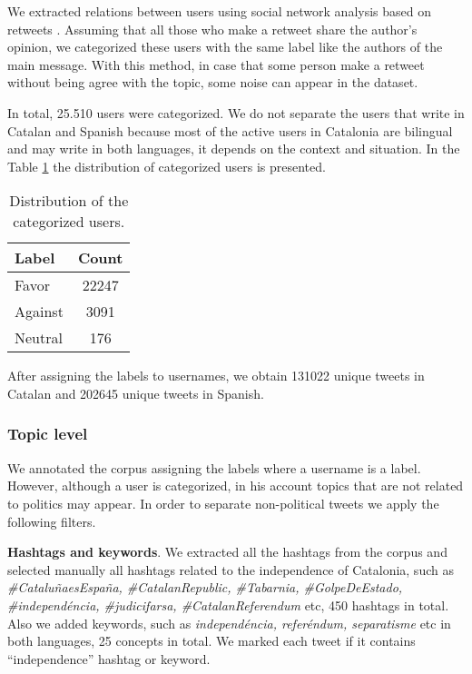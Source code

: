 \documentclass[10pt, a4paper]{article}
\begin{document}
We extracted relations between users using social network analysis based on retweets \cite{SNA2002}. Assuming that all those who make a retweet share the author's opinion, we categorized these users with the same label like the authors of the main message. With this method, in case that some person make a retweet without being agree with the topic, some noise can appear in the dataset.

In total, 25.510 users were categorized. We do not separate the users that write in Catalan and Spanish because most of the  active users in Catalonia are bilingual and may write in both languages, it depends on the context and situation. In the Table \ref{table:users} the distribution of categorized users is presented.

\begin{table}[!ht]
\centering
\begin{tabular}{lc} \hline
      Label & Count \\ \hline
      Favor & 22247 \\
      Against & 3091 \\
     Neutral & 176 \\ \hline
\end{tabular}
\caption{Distribution of the categorized users.}\label{table:users}

\end{table}

After assigning the labels to usernames, we obtain 131022 unique tweets in Catalan and 202645 unique tweets in Spanish.

\subsubsection{Topic level}

We annotated the corpus assigning the labels where a username is a label. However, although a user is categorized, in his account topics that are not related to politics may appear. In order to separate non-political tweets we apply the following filters.

\textbf{Hashtags and keywords}. We extracted all the hashtags from the corpus and selected manually all hashtags related to the independence of Catalonia, such as \textit{\#Catalu\~naesEspa\~na, \#CatalanRepublic, \#Tabarnia, \#GolpeDeEstado, \#independ\'encia, \#judicifarsa, \#CatalanReferendum} etc, 450 hashtags in total. Also we added keywords, such as \textit{independ\'encia, refer\'endum, separatisme} etc in both languages, 25 concepts in total. We marked each tweet if it contains ``independence'' hashtag or keyword.
\end{document}
